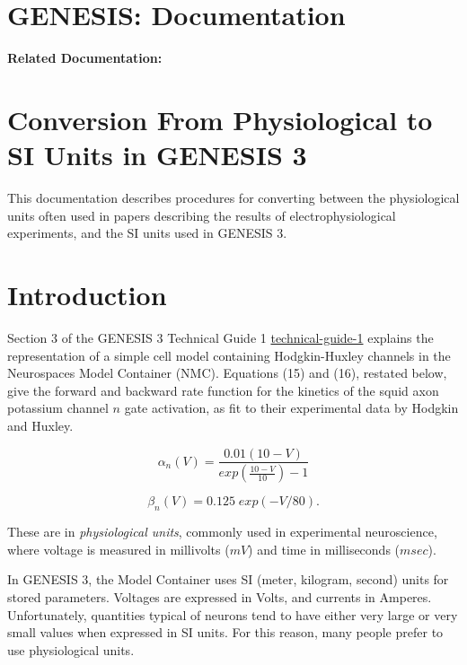 \documentclass[12pt]{article}
\begin{document}
\section*{GENESIS: Documentation}

{\bf Related Documentation:}

\section*{Conversion From Physiological to SI Units in GENESIS 3}


This documentation describes procedures for converting between
the physiological units often used in papers describing the results of
electrophysiological experiments, and the SI units used in GENESIS 3.

\section{Introduction}

Section 3 of the GENESIS 3 Technical Guide 1
\href{../technical-guide-1/technical-guide-1.html}{technical-guide-1}
explains the representation of a simple cell model containing
Hodgkin-Huxley channels in the Neurospaces Model Container (NMC).
Equations (15) and (16), restated below, give the forward and backward rate
function for the kinetics of the squid axon potassium channel $n$ gate
activation, as fit to their experimental data by Hodgkin and Huxley.

\begin{equation}
\alpha_n(V) = \frac{0.01 (10-V)}{exp(\frac{10-V}{10}) - 1}
\label{eq1}
\end{equation}

\begin{equation}
\beta_n(V) = 0.125\; exp(-V/80).
\label{eq2}
\end{equation}
 
These are in {\em physiological units}, commonly used in experimental
neuroscience, where voltage is measured in millivolts ($mV$) and time in
milliseconds ($msec$).  

In GENESIS 3, the Model Container uses SI (meter, kilogram, second) units
for stored parameters.  Voltages are expressed in Volts, and currents in
Amperes.  Unfortunately, quantities typical of neurons tend to
have either very large or very small values when expressed in SI units.
For this reason, many people prefer to use physiological units.
\end{document}
